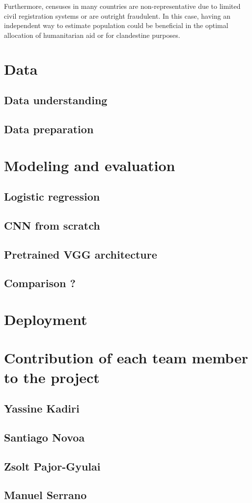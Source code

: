 \documentclass{article}
\begin{document}
Furthermore, censuses in many countries are non-representative due to limited civil registration systems or are outright fraudulent. In this case, having an independent way to estimate population could be beneficial in the optimal allocation of humanitarian aid or for clandestine purposes.

\section{Data}
\subsection{Data understanding}

\subsection{Data preparation}
\section{Modeling and evaluation}
\subsection{Logistic regression}
\subsection{CNN from scratch}
\subsection{Pretrained VGG architecture}
\subsection{Comparison ?}
\section{Deployment}
\appendix
\section{Contribution of each team member to the project}
\subsection{Yassine Kadiri}
\subsection{Santiago Novoa}
\subsection{Zsolt Pajor-Gyulai}
\subsection{Manuel Serrano}
\end{document}
